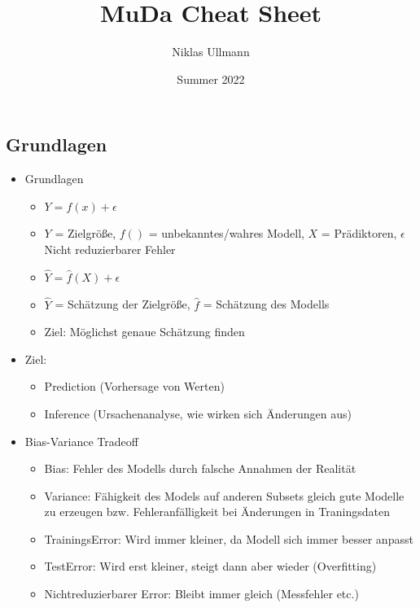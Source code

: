 \documentclass[a4paper]{article}
\title{MuDa Cheat Sheet}
\author{Niklas Ullmann}
\date{Summer 2022}
\begin{document}
\begin{landscape}
    \thispagestyle{empty}

    \begin{multicols}{3}
        \section{Grundlagen}
        \begin{itemize}[noitemsep,nolistsep,leftmargin=*]
            \item Grundlagen
            \begin{itemize}[noitemsep,nolistsep,leftmargin=*]
                \item\textbf{ $Y = f(x) + \epsilon$}
                \item $Y$ = Zielgröße, $f()$ = unbekanntes/wahres Modell, $X$ = Prädiktoren, $\epsilon$ Nicht reduzierbarer Fehler
                \item \textbf{$\hat{Y} = \hat{f}(X)+\epsilon$}
                \item $\hat{Y}$ = Schätzung der Zielgröße, $\hat{f}$ = Schätzung des Modells
                \item Ziel: Möglichst genaue Schätzung finden
            \end{itemize}
            \item Ziel:
            \begin{itemize}[noitemsep,nolistsep,leftmargin=*]
                \item Prediction (Vorhersage von Werten)
                \item Inference (Ursachenanalyse, wie wirken sich Änderungen aus)
            \end{itemize}
            \item Bias-Variance Tradeoff
            \begin{itemize}[noitemsep,nolistsep,leftmargin=*]
                \item Bias: Fehler des Modells durch falsche Annahmen der Realität
                \item Variance: Fähigkeit des Models auf anderen Subsets gleich gute Modelle zu erzeugen bzw. Fehleranfälligkeit bei Änderungen in Traningsdaten
                \item TrainingsError: Wird immer kleiner, da Modell sich immer besser anpasst
                \item TestError: Wird erst kleiner, steigt dann aber wieder (Overfitting)
                \item Nichtreduzierbarer Error: Bleibt immer gleich (Messfehler etc.)

\end{itemize}
\end{itemize}
\end{multicols}
\end{landscape}
\end{document}
